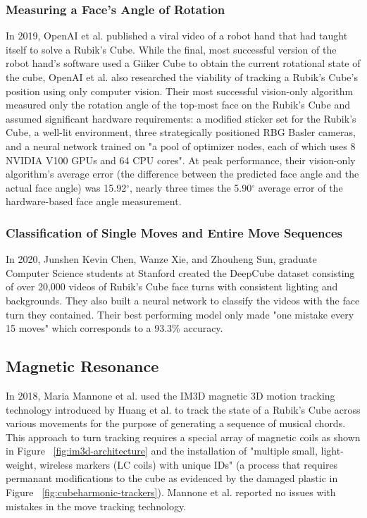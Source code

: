 \subsubsection{Measuring a Face's Angle of Rotation}
In 2019, OpenAI et al. published a viral video of a robot hand that had taught itself to solve a Rubik's Cube.
While the final, most successful version of the robot hand's software used a Giiker Cube to obtain the current rotational state of the cube, OpenAI et al. also researched the viability of tracking a Rubik's Cube's position using only computer vision.
Their most successful vision-only algorithm measured only the rotation angle of the top-most face on the Rubik's Cube and assumed significant hardware requirements: a modified sticker set for the Rubik's Cube, a well-lit environment, three strategically positioned RBG Basler cameras, and a neural network trained on "a pool of optimizer nodes, each of which uses 8 NVIDIA V100 GPUs and 64 CPU cores".
At peak performance, their vision-only algorithm's average error (the difference between the predicted face angle and the actual face angle) was 15.92$^\circ$, nearly three times the 5.90$^\circ$ average error of the hardware-based face angle measurement. \cite{openai2019rubiks}

\subsubsection{Classification of Single Moves and Entire Move Sequences}
In 2020, Junshen Kevin Chen, Wanze Xie, and Zhouheng Sun, graduate Computer Science students at Stanford created the DeepCube dataset consisting of over 20,000 videos of Rubik's Cube face turns with consistent lighting and backgrounds. 
They also built a neural network to classify the videos with the face turn they contained.
Their best performing model only made "one mistake every 15 moves" which corresponds to a 93.3\% accuracy. \cite{chendeepcube}


\subsection{Magnetic Resonance}
In 2018, Maria Mannone et al. used the IM3D magnetic 3D motion tracking technology introduced by Huang et al. \cite{im3d} to track the state of a Rubik's Cube across various movements for the purpose of generating a sequence of musical chords.
This approach to turn tracking requires a special array of magnetic coils as shown in Figure ~\ref{fig:im3d-architecture} and the installation of "multiple small, light-
weight, wireless markers (LC coils) with unique IDs" (a process that requires permanant modifications to the cube as evidenced by the damaged plastic in Figure ~\ref{fig:cubeharmonic-trackers}).
Mannone et al. reported no issues with mistakes in the move tracking technology.

